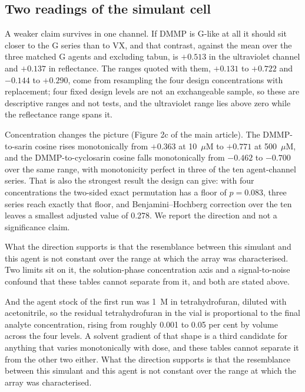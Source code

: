 \documentclass[journal=jacsat,manuscript=suppinfo,margin=1in]{achemso}
\begin{document}
\subsection*{Two readings of the simulant cell}

A weaker claim survives in one channel. If DMMP is G-like at all it should sit
closer to the G series than to VX, and that contrast, against the mean over
the three matched G agents and excluding tabun, is $+0.513$ in the ultraviolet
channel and $+0.137$ in reflectance. The ranges quoted with them, $+0.131$ to
$+0.722$ and $-0.144$ to $+0.290$, come from resampling the four design
concentrations with replacement; four fixed design levels are not an
exchangeable sample, so these are descriptive ranges and not tests, and the
ultraviolet range lies above zero while the reflectance range spans it.

Concentration changes the picture (Figure 2c of the main article). The
DMMP-to-sarin cosine rises monotonically from $+0.363$ at 10~$\mu$M to
$+0.771$ at 500~$\mu$M, and the DMMP-to-cyclosarin cosine falls monotonically
from $-0.462$ to $-0.700$ over the same range, with monotonicity perfect in
three of the ten agent-channel series. That is also the strongest result the
design can give: with four concentrations the two-sided exact permutation has
a floor of $p=0.083$, three series reach exactly that floor, and
Benjamini--Hochberg correction over the ten leaves a smallest adjusted value
of 0.278. We report the direction and not a significance claim.

What the direction supports is that the resemblance between this simulant and
this agent is not constant over the range at which the array was
characterised. Two limits sit on it, the solution-phase concentration axis and
a signal-to-noise confound that these tables cannot separate from it, and both are stated above.

And the agent stock of the first run was 1~M in tetrahydrofuran, diluted with
acetonitrile, so the residual tetrahydrofuran in the vial is proportional to
the final analyte concentration, rising from roughly 0.001 to 0.05 per cent by
volume across the four levels. A solvent gradient of that shape is a third
candidate for anything that varies monotonically with dose, and these tables
cannot separate it from the other two either. What the direction supports is
that the resemblance between this simulant and this agent is not constant over
the range at which the array was characterised.
\end{document}

